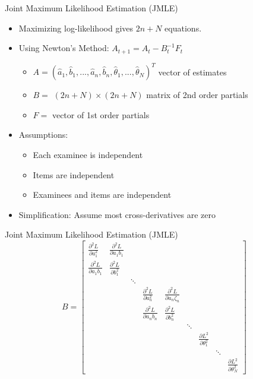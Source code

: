 \documentclass{beamer}
\theoremstyle{definition}
\begin{document}
\begin{frame}{Joint Maximum Likelihood Estimation (JMLE)}
\begin{itemize}
  \item Maximizing log-likelihood gives $2n+N$ equations.
  \item Using Newton's Method: $A_{t+1} = A_t - B_t^{-1}F_t$
  \begin{itemize}
    \item $A = (\hat a_1, \hat b_1, ..., \hat a_n, \hat b_n, \hat\theta_1, ..., \hat\theta_N)^T$ vector of estimates 
    \item $B = $ $(2n+N) \times (2n+N)$ matrix of 2nd order partials
    \item $F = $ vector of 1st order partials
  \end{itemize}
  \item<2-> Assumptions:
  \begin{itemize}
    \item<2-> Each examinee is independent
    \item<2-> Items are independent
    \item<2-> Examinees and items are independent
  \end{itemize}
  \item<3> Simplification: Assume most cross-derivatives are zero
\end{itemize}
\end{frame}

\begin{frame}{Joint Maximum Likelihood Estimation (JMLE)}
\[B = \begin{bmatrix}
\frac{\partial^2L}{\partial a_1^2} & \frac{\partial^2L}{\partial a_1 b_1} & & & & & & & \\
\frac{\partial^2L}{\partial a_1 b_1} & \frac{\partial^2L}{\partial b_1^2} & & & & & & & \\
& & \ddots & & & & & & \\
& & & \frac{\partial^2L}{\partial a_n^2} & \frac{\partial^2L}{\partial a_n\zeta_n} & & & & \\
& & & \frac{\partial^2L}{\partial a_n b_n} & \frac{\partial^2L}{\partial b_n^2} & & & & \\
& & & & & \ddots & & & \\
& & & & & & \frac{\partial L^2}{\partial \theta_1^2} & & \\
& & & & & & & \ddots & \\
& & & & & & & & \frac{\partial L^2}{\partial \theta_N^2} 
\end{bmatrix}\]
\end{frame}
\end{document}
